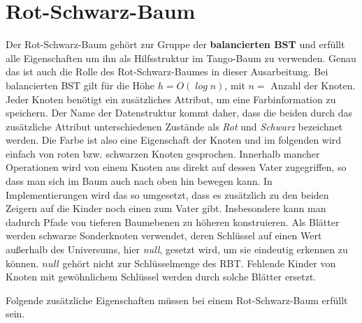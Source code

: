 \documentclass[a4paper,12pt]{article}
\begin{document}
\section{Rot-Schwarz-Baum}
Der Rot-Schwarz-Baum gehört zur Gruppe der \textbf{balancierten BST} und erfüllt alle Eigenschaften um ihn als Hilfsstruktur im Tango-Baum zu verwenden. Genau das ist auch die Rolle des Rot-Schwarz-Baumes in dieser Ausarbeitung. Bei balancierten BST gilt für die Höhe $h = \mathit{O(\log n)}$, mit $n =$ Anzahl der Knoten. Jeder Knoten benötigt ein zusätzliches Attribut, um eine Farbinformation zu speichern. Der Name der Datenstruktur kommt daher, dass die beiden durch das zusätzliche Attribut unterschiedenen Zustände als \textit{Rot} und \textit{Schwarz} bezeichnet werden. Die Farbe ist also eine Eigenschaft der Knoten und im folgenden wird einfach von roten bzw. schwarzen Knoten gesprochen. Innerhalb mancher Operationen wird von einem Knoten aus direkt auf dessen Vater zugegriffen, so dass man sich im Baum auch nach oben hin bewegen kann. In Implementierungen wird das so umgesetzt, dass es zusätzlich zu den beiden Zeigern auf die Kinder noch einen zum Vater gibt. Insbesondere kann man dadurch Pfade von tieferen Baumebenen zu höheren konstruieren. Als Blätter werden schwarze Sonderknoten verwendet, deren Schlüssel auf einen Wert außerhalb des Universums, hier \textit{null}, gesetzt wird, um sie eindeutig erkennen zu können. $\mathit{null}$ gehört nicht zur Schlüsselmenge des RBT. Fehlende Kinder von Knoten mit gewöhnlichem Schlüssel werden durch solche Blätter ersetzt.  

\noindent Folgende zusätzliche Eigenschaften müssen bei einem Rot-Schwarz-Baum erfüllt sein. 
\end{document}
